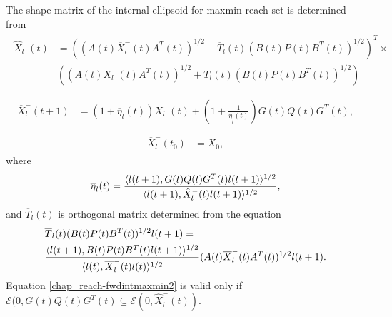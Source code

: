 \documentclass[letterpaper,10pt,english]{sphinxmanual}
\begin{document}
The shape matrix of the internal ellipsoid for maxmin reach set is
determined from
\label{chap_reach:equation-fwdintmaxmin1}\begin{gather}
\begin{split}\hat{X}^-_l(t) & =
\left((A(t)\overline{X}^-_l(t)A^T(t))^{1/2} +
\overline{T}_l(t)(B(t)P(t)B^T(t))^{1/2}\right)^T
\times \nonumber \\
& \left((A(t)\overline{X}^-_l(t)A^T(t))^{1/2} +
\overline{T}_l(t)(B(t)P(t)B^T(t))^{1/2}\right)\\\end{split}\label{chap_reach-fwdintmaxmin1}
\end{gather}\label{chap_reach:equation-fwdintmaxmin2}\begin{gather}
\begin{split}\overline{X}^-_l(t+1) & =
(1+\overline{\eta}_l(t))\hat{X}^-_l(t) +
\left(1+\frac{1}{\underline{\eta}_l(t)}\right)
G(t)Q(t)G^T(t), \\\end{split}\label{chap_reach-fwdintmaxmin2}
\end{gather}\label{chap_reach:equation-fwdintmaxmin3}\begin{gather}
\begin{split}\overline{X}^-_l(t_0) & = X_0,\end{split}\label{chap_reach-fwdintmaxmin3}
\end{gather}
where
\begin{gather}
\begin{split}\overline{\eta}_l(t) = \frac{\langle l(t+1),
G(t)Q(t)G^T(t)l(t+1)\rangle^{1/2}}{\langle l(t+1),
\hat{X}^-_l(t)l(t+1)\rangle^{1/2}},\end{split}\notag
\end{gather}
and \(\overline{T}_l(t)\) is orthogonal matrix determined from the
equation
\begin{gather}
\begin{split}\begin{aligned}
& \overline{T}_l(t)(B(t)P(t)B^T(t))^{1/2}l(t+1) = \\
& \frac{\langle l(t+1),
B(t)P(t)B^T(t)l(t+1)\rangle^{1/2}}{\langle l(t),
\overline{X}^-_l(t)l(t)\rangle^{1/2}}(A(t)\overline{X}^-_l(t)A^T(t))^{1/2}l(t+1).\end{aligned}\end{split}\notag
\end{gather}
Equation \eqref{chap_reach-fwdintmaxmin2} is valid only if
\({\mathcal E}(0,G(t)Q(t)G^T(t)\subseteq{\mathcal E}(0,\hat{X}^-_l(t))\).
\end{document}
